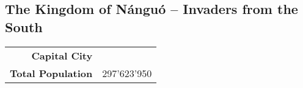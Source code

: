 \subsection{The Kingdom of N\'angu\'o -- Invaders from the South}
\begin{tabular}{r | l}
    \textbf{Capital City} & \\
    \textbf{Total Population} & 297'623'950
\end{tabular}